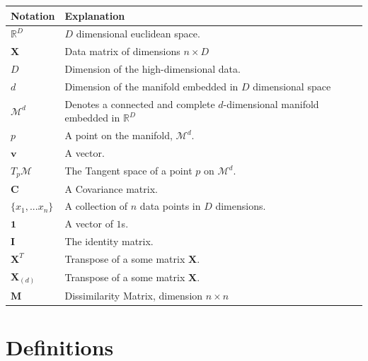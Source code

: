 \documentclass[12pt]{report}
\begin{document}
\begin{table}[h]
\begin{tabular}{|l|l|}
\hline
\textbf{Notation} & \textbf{Explanation}                                      \\ \hline
$\mathbb{R}^D$    & $D$ dimensional euclidean space.                      \\ \hline
$\mathbf{X}$        & Data matrix of dimensions $n \times D$                       \\ \hline
$D$                & Dimension of the high-dimensional data.                \\ \hline
$d$               & Dimension of the manifold embedded in $D$ dimensional space \\ \hline
$\mathcal{M}^d$      & Denotes a connected and complete $d$-dimensional manifold
                   embedded in $\mathbb{R}^D$                                 \\ \hline
$p$               & A point on the manifold, $\mathcal{M}^d$.            \\ \hline
$\mathbf{v}$        & A vector.                                         \\ \hline
$T_p\mathcal{M}$    & The Tangent space of a point $p$ on $\mathcal{M}^d$.   \\ \hline
$\mathbf{C}$        & A Covariance matrix.                               \\ \hline
$\{x_1,...x_n\}$  & A collection of $n$ data points in $D$ dimensions.   \\ \hline
$\mathbf{1}$      & A vector of $1$s.                                   \\ \hline
$\mathbf{I}$      & The identity matrix.                               \\ \hline
$\mathbf{X}^T$    & Transpose of a some matrix $\mathbf{X}$.                 \\ \hline
$\mathbf{X}_{(d)}$    & Transpose of a some matrix $\mathbf{X}$.               \\ \hline
$\mathbf{M}$    & Dissimilarity Matrix, dimension $n \times n$                  \\ \hline
\end{tabular}
\end{table}

\newpage

\section{Definitions}
\end{document}
